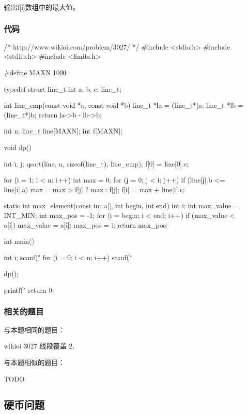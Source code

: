 输出f[i]数组中的最大值。

\subsubsection{代码}

\begin{Codex}[label=lines_cover.c]
/* http://www.wikioi.com/problem/3027/ */
#include <stdio.h>
#include <stdlib.h>
#include <limits.h>

#define MAXN 1000

typedef struct line_t {
    int a, b, c;
} line_t;

int line_cmp(const void *a, const void *b) {
    line_t *la = (line_t*)a;
    line_t *lb = (line_t*)b;
    return la->b - lb->b;
}

int n;
line_t line[MAXN];
int f[MAXN];

void dp() {
    int i, j;
    qsort(line, n, sizeof(line_t), line_cmp);
    f[0] = line[0].c;

    for (i = 1; i < n; i++) {
        int max = 0;
        for (j = 0; j < i; j++) {
            if (line[j].b <= line[i].a) max = max > f[j] ? max : f[j];
        }
        f[i] = max + line[i].c;
    }
}


static int max_element(const int a[], int begin, int end) {
    int i;
    int max_value = INT_MIN;
    int max_pos = -1;
    for (i = begin; i < end; i++) {
        if (max_value < a[i]) {
            max_value = a[i];
            max_pos = i;
        }
    }
    return max_pos;
}


int main() {
    int i;
    scanf("%
    for (i = 0; i < n; i++) scanf("%

    dp();

    printf("%
    return 0;
}
\end{Codex}

\subsubsection{相关的题目}
与本题相同的题目：
\begindot
\item  wikioi 3027 线段覆盖 2, 
\myenddot

与本题相似的题目：
\begindot
\item  TODO
\myenddot


\subsection{硬币问题}

